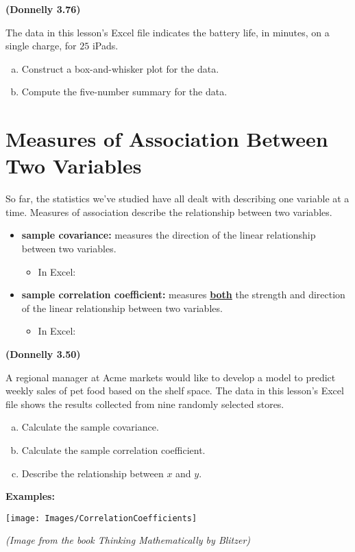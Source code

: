 \documentclass[12pt, letterpaper]{article}
\newcounter{exercise}
\theoremstyle{definition}
\begin{document}
\begin{exercise} \textbf{(Donnelly 3.76)}

The data in this lesson's Excel file indicates the battery life, in minutes, on a single charge, for $25$ iPads.

\begin{enumerate}[(a)]
\item Construct a box-and-whisker plot for the data.
\item Compute the five-number summary for the data.
\end{enumerate}

\end{exercise}

\vfill

\newpage

\section*{Measures of Association Between Two Variables}

So far, the statistics we've studied have all dealt with describing one variable at a time.  Measures of association describe the relationship between two variables.

\begin{defn}
\begin{itemize}
\item \textbf{sample covariance:}  measures the direction of the linear relationship between two variables.
\begin{itemize}
\item In Excel:
\end{itemize}
\item \textbf{sample correlation coefficient:}  measures \textbf{\underline{both}} the strength and direction of the linear relationship between two variables.
\begin{itemize}
\item In Excel:
\end{itemize}
\end{itemize}
\end{defn}

\begin{exercise} \textbf{(Donnelly 3.50)}

A regional manager at Acme markets would like to develop a model to predict weekly sales of pet food based on the shelf space.  The data in this lesson's Excel file shows the results collected from nine randomly selected stores.

\begin{enumerate}[(a)]
\item Calculate the sample covariance.
\item Calculate the sample correlation coefficient.
\item Describe the relationship between $x$ and $y$.
\end{enumerate}

\end{exercise}

\vfill

\noindent\hrulefill

\noindent\textbf{Examples:}

\begin{center}
\texttt{[image: Images/CorrelationCoefficients]}

\textit{(Image from the book \textit{Thinking Mathematically} by Blitzer)}

\end{center}
\end{document}
